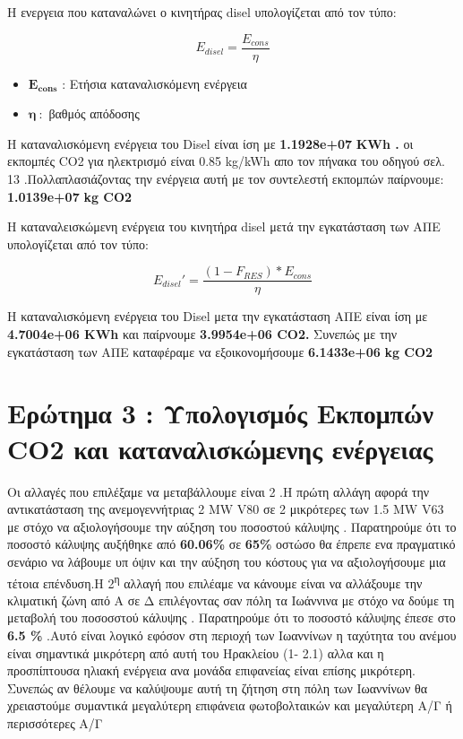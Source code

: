 \documentclass[]{article}
\begin{document}
Η ενεργεια που καταναλώνει ο κινητήρας disel υπολογίζεται από τον τύπο:

\[E_{disel} = \frac{E_{cons}}{\eta}\]

\begin{itemize}
\item \(\mathbf{E}_{\mathbf{cons}}\) : Ετήσια καταναλισκόμενη ενέργεια
\item \(\mathbf{\eta\ }\mathbf{:}\) βαθμός απόδοσης
\end{itemize}

Η καταναλισκόμενη ενέργεια του Disel είναι ίση με \textbf{1.1928e+07} \textbf{ΚWh .} οι εκπομπές CO2 για ηλεκτρισμό είναι 0.85 kg/kWh απο τον πήνακα του οδηγού σελ. 13 .Πολλαπλασιάζοντας την ενέργεια αυτή με τον συντελεστή εκπομπών παίρνουμε: \textbf{1.0139e+07} \textbf{kg CO2}

Η καταναλεισκώμενη ενέργεια του κινητήρα disel μετά την εγκατάσταση των ΑΠΕ υπολογίζεται από τον τύπο:

\[E_{disel}' = \frac{\left( 1 - F_{RES} \right)*E_{cons}}{\eta}\]

Η καταναλισκόμενη ενέργεια του Disel μετα την εγκατάσταση ΑΠΕ είναι ίση με \textbf{4.7004e+06 ΚWh} και παίρνουμε \textbf{3.9954e+06 CO2.} Συνεπώς με την εγκατάσταση των ΑΠΕ καταφέραμε να εξοικονομήσουμε \textbf{6.1433e+06} \textbf{kg CO2}

\hypertarget{ερώτημα-3-υπολογισμός-εκπομπών-co2-και-καταναλισκώμενης-ενέργειας}{%
\section{Ερώτημα 3 : Υπολογισμός Εκπομπών CO2 και καταναλισκώμενης ενέργειας}\label{ερώτημα-3-υπολογισμός-εκπομπών-co2-και-καταναλισκώμενης-ενέργειας}}

Οι αλλαγές που επιλέξαμε να μεταβάλλουμε είναι 2 .Η πρώτη αλλάγη αφορά την αντικατάσταση της ανεμογεννήτριας 2 ΜW V80 σε 2 μικρότερες των 1.5 ΜW V63 με στόχο να αξιολογήσουμε την αύξηση του ποσοστού κάλυψης . Παρατηρούμε ότι το ποσοστό κάλυψης αυξήθηκε από \textbf{60.06\%} σε \textbf{65\%} οστώσο θα έπρεπε ενα πραγματικό σενάριο να λάβουμε υπ όψιν και την αύξηση του κόστους για να αξιολογήσουμε μια τέτοια επένδυση.Η 2\textsuperscript{η} αλλαγή που επιλέαμε να κάνουμε είναι να αλλάξουμε την κλιματική ζώνη από Α σε Δ επιλέγοντας σαν πόλη τα Ιωάννινα με στόχο να δούμε τη μεταβολή του ποσοσστού κάλυψης . Παρατηρούμε ότι το ποσοστό κάλυψης έπεσε στο \textbf{6.5 \%} .Αυτό είναι λογικό εφόσον στη περιοχή των Ιωαννίνων η ταχύτητα του ανέμου είναι σημαντικά μικρότερη από αυτή του Ηρακλείου (1- 2.1) αλλα και η προσπίπτουσα ηλιακή ενέργεια ανα μονάδα επιφανείας είναι επίσης μικρότερη. Συνεπώς αν θέλουμε να καλύψουμε αυτή τη ζήτηση στη πόλη των Ιωαννίνων θα χρειαστούμε συμαντικά μεγαλύτερη επιφάνεια φωτοβολταικών και μεγαλύτερη Α/Γ ή περισσότερες Α/Γ
\end{document}
